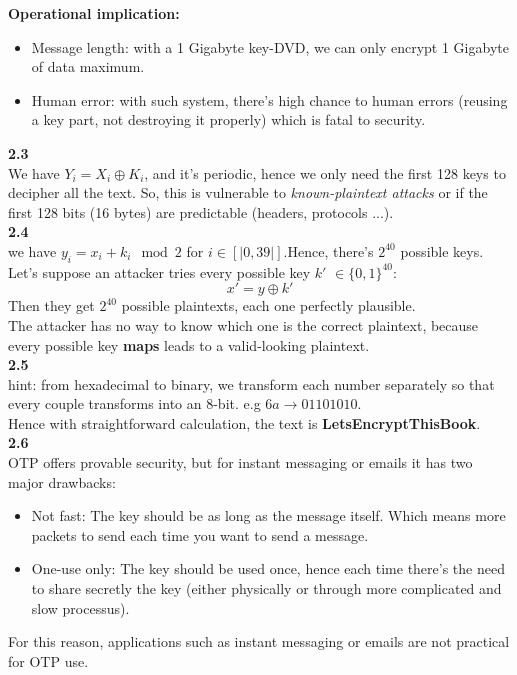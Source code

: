 \noindent \textbf{Operational implication:}
\begin{itemize}
    \item Message length: with a 1 Gigabyte key-DVD, we can only encrypt 1 Gigabyte of data maximum.
    \item Human error: with such system, there's high chance to human errors (reusing a key part, not destroying it properly) which is fatal to security.
\end{itemize}

\textbf{2.3}\\
We have $Y_i = X_i \oplus K_i$, and it's periodic, hence we only need the first 128 keys to decipher all the text. So, this is vulnerable to \textit{known-plaintext attacks} or if the first 128 bits (16 bytes) are predictable (headers, protocols ...).\\

\textbf{2.4}\\
we have $y_i = x_i + k_i \mod{2}$ for $i \in [| 0,39|]$.Hence, there's $2^{40}$ possible keys.\\
Let's suppose an attacker tries every possible key $k'$ $\in \{0,1\}^{40}$:
\begin{equation*}
    x' = y\oplus k'
\end{equation*}
Then they get $2^{40}$ possible plaintexts, each one perfectly plausible.\\
The attacker has no way to know which one is the correct plaintext, because every possible key \textbf{maps} leads to a valid-looking plaintext.\\

\textbf{2.5}\\
hint: from hexadecimal to binary, we transform each number separately so that every couple transforms into an 8-bit. e.g $6a \rightarrow 0110 1010$.\\
Hence with straightforward calculation, the text is \textbf{LetsEncryptThisBook}.\\

\textbf{2.6}\\

OTP offers provable security, but for instant messaging or emails it has two major drawbacks:
\begin{itemize}
    \item Not fast: The key should be as long as the message itself. Which means more packets to send each time you want to send a message.
    \item One-use only: The key should be used once, hence each time there's the need to share secretly the key (either physically or through more complicated and slow processus). 
\end{itemize}
For this reason, applications such as instant messaging or emails are not practical for OTP use. \\

